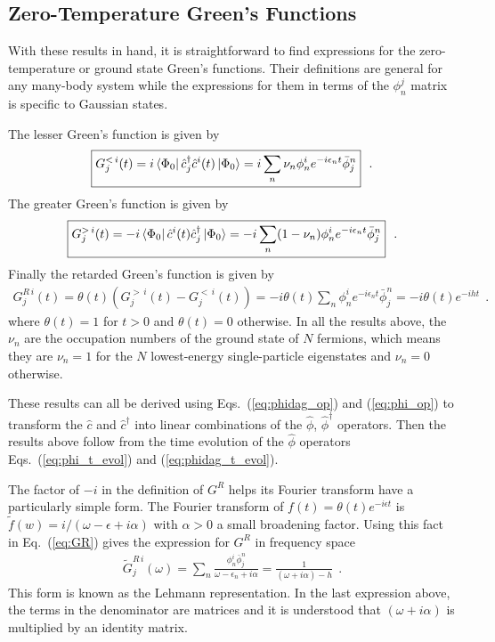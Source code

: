 \documentclass[aps, superscriptaddress, floatfix, onecolumn]{revtex4-2}
\begin{document}
\subsection{Zero-Temperature Green's Functions}

With these results in hand, it is straightforward to find expressions for the zero-temperature or ground state Green's functions. 
Their definitions are general for any many-body system while the expressions for them in terms of the $\phi^j_n$ matrix is specific to Gaussian states.

The lesser Green's function is given by
\begin{align}
\boxed{G^{<\, i}_j(t)= i \bra{\Phi_0} \hat{c}^\dagger_j \hat{c}^i(t) \ket{\Phi_0}  = i \sum_n \nu_n  \phi^i_n e^{-i \epsilon_n t}  \bar{\phi}_j^n} \ \ .
\end{align}
The greater Green's function is given by
\begin{align}
\boxed{G^{>\, i}_j(t)= -i \bra{\Phi_0} \hat{c}^i(t) \hat{c}^\dagger_j \ket{\Phi_0} = -i \sum_n (1-\nu_n) \phi^i_n e^{-i \epsilon_n t} \bar{\phi}_j^n} \ \ .
\end{align}
Finally the retarded Green's function is given by
\begin{align}
\boxed{G^{R\, i}_j(t) = \theta(t)(G^{>\, i}_j(t) - G^{<\, i}_j(t)) = -i \theta(t) \sum_n \phi^i_n e^{-i \epsilon_n t} \bar{\phi}_j^n  = -i \theta(t) e^{-i h t} } \ \ .  \label{eq:GR}
\end{align}
where $\theta(t) = 1$ for $t > 0$ and $\theta(t) = 0$ otherwise.
In all the results above, the $\nu_n$ are the occupation numbers of the ground state of $N$ fermions, which means they are $\nu_n = 1$ for the $N$ lowest-energy single-particle eigenstates and $\nu_n = 0$ otherwise.

These results can all be derived using Eqs.~(\ref{eq:phidag_op}) and (\ref{eq:phi_op}) to transform the $\hat{c}$ and $\hat{c}^\dagger$ into linear combinations of the $\hat{\phi}$, $\hat{\phi}^\dagger$ operators. Then the results above follow from the time evolution of the $\hat{\phi}$ operators Eqs.~(\ref{eq:phi_t_evol}) and (\ref{eq:phidag_t_evol}).

The factor of $-i$ in the definition of $G^R$ helps its Fourier transform have a particularly simple form. The Fourier transform of $f(t) = \theta(t) e^{-i \epsilon t}$ is $\tilde{f}(w) = i/(\omega - \epsilon + i \alpha)$ with $\alpha > 0$ a small broadening factor. Using this fact in Eq.~(\ref{eq:GR}) gives the expression for $G^R$ in frequency space
\begin{align}
\boxed{ \tilde{G}^{R\, i}_j(\omega)  = \sum_n \frac{\phi^i_n \bar{\phi}_j^n}{\omega - \epsilon_n + i \alpha} = \frac{1}{(\omega + i \alpha) - h } } \ \ .
\end{align}
This form is known as the Lehmann representation. In the last expression above, the terms in the denominator are matrices and it is understood that $(\omega + i \alpha)$ is multiplied by an identity matrix.
\end{document}
